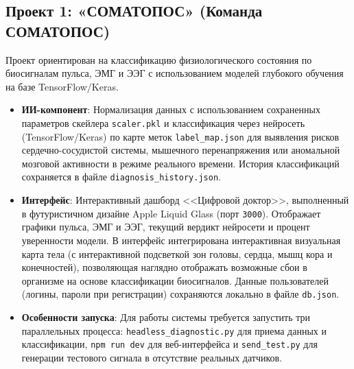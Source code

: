 \documentclass[utf8, russian]{eskdtext}
\begin{document}
\subsection{Проект 1: «СОМАТОПОС» (Команда СОМАТОПОС)}
Проект ориентирован на классификацию физиологического состояния по биосигналам пульса, ЭМГ и ЭЭГ с использованием моделей глубокого обучения на базе TensorFlow/Keras.
\begin{itemize}
    \item \textbf{ИИ-компонент}: Нормализация данных с использованием сохраненных параметров скейлера \texttt{scaler.pkl} и классификация через нейросеть (TensorFlow/Keras) по карте меток \texttt{label\_map.json} для выявления рисков сердечно-сосудистой системы, мышечного перенапряжения или аномальной мозговой активности в режиме реального времени. История классификаций сохраняется в файле \texttt{diagnosis\_history.json}.
    \item \textbf{Интерфейс}: Интерактивный дашборд <<Цифровой доктор>>, выполненный в футуристичном дизайне Apple Liquid Glass (порт \texttt{3000}). Отображает графики пульса, ЭМГ и ЭЭГ, текущий вердикт нейросети и процент уверенности модели. В интерфейс интегрирована интерактивная визуальная карта тела (с интерактивной подсветкой зон головы, сердца, мышц кора и конечностей), позволяющая наглядно отображать возможные сбои в организме на основе классификации биосигналов. Данные пользователей (логины, пароли при регистрации) сохраняются локально в файле \texttt{db.json}.
    \item \textbf{Особенности запуска}: Для работы системы требуется запустить три параллельных процесса: \texttt{headless\_diagnostic.py} для приема данных и классификации, \texttt{npm run dev} для веб-интерфейса и \texttt{send\_test.py} для генерации тестового сигнала в отсутствие реальных датчиков.
\end{itemize}
\end{document}
